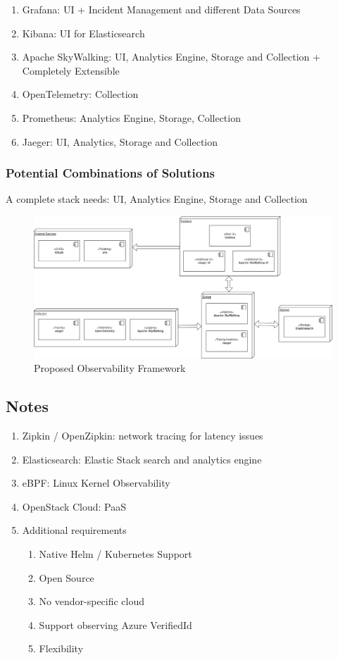 \begin{enumerate}
    \item Grafana: UI + Incident Management and different Data Sources
    \item Kibana: UI for Elasticsearch
    \item Apache SkyWalking: UI, Analytics Engine, Storage and Collection + Completely Extensible
    \item OpenTelemetry: Collection
    \item Prometheus: Analytics Engine, Storage, Collection
    \item Jaeger: UI, Analytics, Storage and Collection
\end{enumerate}

\subsubsection{Potential Combinations of Solutions}

A complete stack needs: UI, Analytics Engine, Storage and Collection

\begin{figure}[h]
	\centering
	\includegraphics[width=\textwidth]{figures/ObservabilityFramework.png}
	\caption{Proposed Observability Framework}
	\label{fig:proposed_observability_framework}
\end{figure}


\subsection{Notes}

\begin{enumerate}
    \item Zipkin / OpenZipkin: network tracing for latency issues
    \item Elasticsearch: Elastic Stack search and analytics engine
    \item eBPF: Linux Kernel Observability
    \item OpenStack Cloud: PaaS
    \item Additional requirements
    \begin{enumerate}
        \item Native Helm / Kubernetes Support
        \item Open Source
        \item No vendor-specific cloud
        \item Support observing Azure VerifiedId
        \item Flexibility
    \end{enumerate} 
\end{enumerate}

